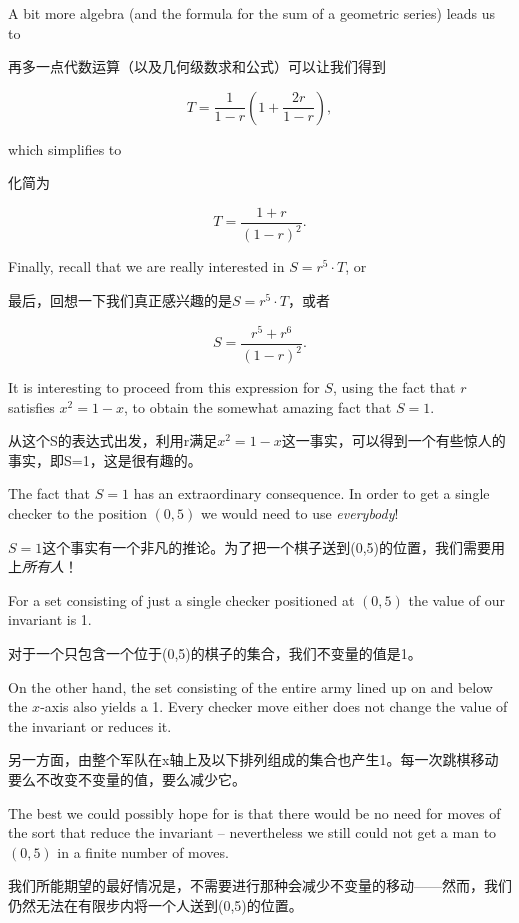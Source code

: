 A bit more algebra (and the formula for the sum of a geometric series) leads us to

再多一点代数运算（以及几何级数求和公式）可以让我们得到

\[ T = \frac{1}{1-r}\left( 1 + \frac{2r}{1-r} \right), \]

\noindent

which simplifies to 

\noindent

化简为

\[ T = \frac{1+r}{(1-r)^2}. \]

Finally, recall that we are really interested in $S = r^5 \cdot T$, or

最后，回想一下我们真正感兴趣的是$S = r^5 \cdot T$，或者

\[ S = \frac{r^5 + r^6}{(1-r)^2}. \]

It is interesting to proceed from this expression for $S$,
using the fact that $r$ satisfies $x^2 = 1 - x$, to obtain the somewhat
amazing fact that $S=1$.

从这个S的表达式出发，利用r满足$x^2 = 1 - x$这一事实，可以得到一个有些惊人的事实，即S=1，这是很有趣的。

The fact that $S=1$ has an extraordinary consequence.
In order to get a single
checker to the position $(0,5)$ we would need to use \emph{everybody}!

$S=1$这个事实有一个非凡的推论。为了把一个棋子送到(0,5)的位置，我们需要用上\emph{所有人}！

For a set consisting of just a single
checker positioned at $(0,5)$ the value of our invariant is 1.

对于一个只包含一个位于(0,5)的棋子的集合，我们不变量的值是1。

On the other hand, the set consisting of the entire army lined 
up on and below the $x$-axis also yields a 1.  Every checker move either
does not change the value of the invariant or reduces it.

另一方面，由整个军队在x轴上及以下排列组成的集合也产生1。每一次跳棋移动要么不改变不变量的值，要么减少它。

The best 
we could possibly hope for is that there would be no need for moves 
of the sort that reduce
the invariant -- nevertheless we still could not get a man to $(0,5)$ 
in a finite number of moves.

我们所能期望的最好情况是，不需要进行那种会减少不变量的移动——然而，我们仍然无法在有限步内将一个人送到(0,5)的位置。

\clearpage

